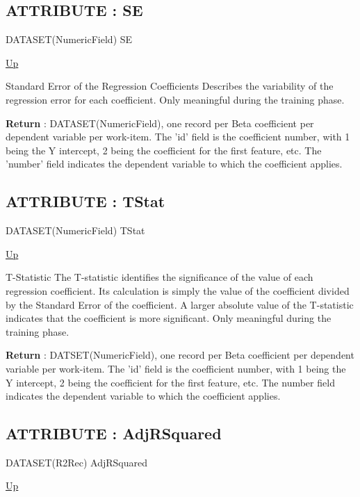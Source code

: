 \subsection*{ATTRIBUTE : SE}
\hypertarget{ecldoc:linearregression.ols.se}{}
\begin{minipage}[t]{\textwidth}
\begin{flushleft}
DATASET(NumericField) SE 
\end{flushleft}
\end{minipage}
\hyperlink{ecldoc:linearregression.ols}{Up}

\par
Standard Error of the Regression Coefficients Describes the variability of the regression error for each coefficient. Only meaningful during the training phase.
\par
\textbf{Return} : DATASET(NumericField), one record per Beta coefficient per dependent variable per work-item. The 'id' field is the coefficient number, with 1 being the Y intercept, 2 being the coefficient for the first feature, etc. The 'number' field indicates the dependent variable to which the coefficient applies. \\
\subsection*{ATTRIBUTE : TStat}
\hypertarget{ecldoc:linearregression.ols.tstat}{}
\begin{minipage}[t]{\textwidth}
\begin{flushleft}
DATASET(NumericField) TStat 
\end{flushleft}
\end{minipage}
\hyperlink{ecldoc:linearregression.ols}{Up}

\par
T-Statistic The T-statistic identifies the significance of the value of each regression coefficient. Its calculation is simply the value of the coefficient divided by the Standard Error of the coefficient. A larger absolute value of the T-statistic indicates that the coefficient is more significant. Only meaningful during the training phase.
\par
\textbf{Return} : DATSET(NumericField), one record per Beta coefficient per dependent variable per work-item. The 'id' field is the coefficient number, with 1 being the Y intercept, 2 being the coefficient for the first feature, etc. The number field indicates the dependent variable to which the coefficient applies. \\
\subsection*{ATTRIBUTE : AdjRSquared}
\hypertarget{ecldoc:linearregression.ols.adjrsquared}{}
\begin{minipage}[t]{\textwidth}
\begin{flushleft}
DATASET(R2Rec) AdjRSquared 
\end{flushleft}
\end{minipage}
\hyperlink{ecldoc:linearregression.ols}{Up}

